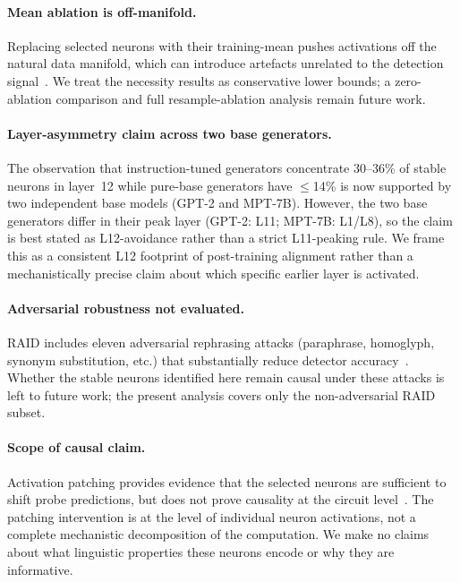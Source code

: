 \documentclass[11pt]{article}
\begin{document}
\paragraph{Mean ablation is off-manifold.}
Replacing selected neurons with their training-mean pushes activations off the natural data manifold, which can introduce artefacts unrelated to the detection signal~\citep{heimersheim2024patching}. We treat the necessity results as conservative lower bounds; a zero-ablation comparison and full resample-ablation analysis remain future work.

\paragraph{Layer-asymmetry claim across two base generators.}
The observation that instruction-tuned generators concentrate 30--36\% of stable neurons in layer~12 while pure-base generators have $\leq$14\% is now supported by two independent base models (GPT-2 and MPT-7B). However, the two base generators differ in their peak layer (GPT-2: L11; MPT-7B: L1/L8), so the claim is best stated as L12-avoidance rather than a strict L11-peaking rule. We frame this as a consistent L12 footprint of post-training alignment rather than a mechanistically precise claim about which specific earlier layer is activated.

\paragraph{Adversarial robustness not evaluated.}
RAID includes eleven adversarial rephrasing attacks (paraphrase, homoglyph, synonym substitution, etc.) that substantially reduce detector accuracy~\citep{dugan2024raid}. Whether the stable neurons identified here remain causal under these attacks is left to future work; the present analysis covers only the non-adversarial RAID subset.

\paragraph{Scope of causal claim.}
Activation patching provides evidence that the selected neurons are sufficient to shift probe predictions, but does not prove causality at the circuit level~\citep{meng2022rome}. The patching intervention is at the level of individual neuron activations, not a complete mechanistic decomposition of the computation. We make no claims about what linguistic properties these neurons encode or why they are informative.
\end{document}
